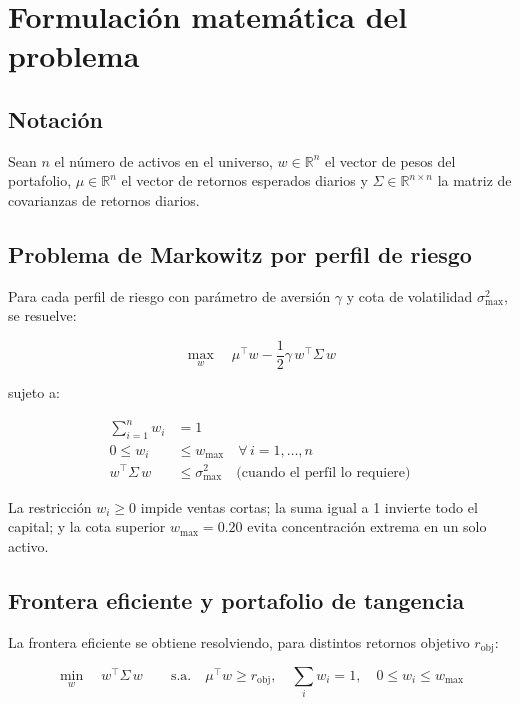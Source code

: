 \section{Formulación matemática del problema}
 
\subsection{Notación}
 
Sean $n$ el n\'umero de activos en el universo, $w \in \mathbb{R}^n$ el vector de pesos del portafolio, $\mu \in \mathbb{R}^n$ el vector de retornos esperados diarios y $\Sigma \in \mathbb{R}^{n \times n}$ la matriz de covarianzas de retornos diarios.
 
\subsection{Problema de Markowitz por perfil de riesgo}
 
Para cada perfil de riesgo con par\'ametro de aversi\'on $\gamma$ y cota de volatilidad $\sigma_{\max}^2$, se resuelve:
 
\begin{equation}
\max_{w} \quad \mu^\top w - \frac{1}{2} \gamma \, w^\top \Sigma \, w
\end{equation}
 
sujeto a:
 
\begin{align}
\sum_{i=1}^{n} w_i &= 1 \\
0 \leq w_i &\leq w_{\max} \quad \forall \, i = 1, \ldots, n \\
w^\top \Sigma \, w &\leq \sigma_{\max}^2 \quad \text{(cuando el perfil lo requiere)}
\end{align}
 
La restricci\'on $w_i \geq 0$ impide ventas cortas; la suma igual a 1 invierte todo el capital; y la cota superior $w_{\max} = 0.20$ evita concentraci\'on extrema en un solo activo.
 
\subsection{Frontera eficiente y portafolio de tangencia}
 
La frontera eficiente se obtiene resolviendo, para distintos retornos objetivo $r_{\text{obj}}$:
 
\begin{equation}
\min_{w} \quad w^\top \Sigma \, w \qquad \text{s.a.} \quad \mu^\top w \geq r_{\text{obj}}, \quad \sum_i w_i = 1, \quad 0 \leq w_i \leq w_{\max}
\end{equation}
 
